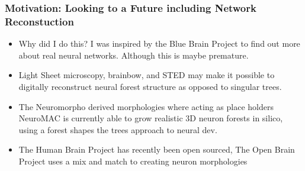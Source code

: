 \documentclass{beamer}
\begin{document}

\begin{frame}
\frametitle{Motivation: Looking to a Future including Network Reconstuction}%
\begin{itemize}
\vfill\item Why did I do this? I was inspired by the Blue Brain Project to find out more about real neural networks. Although this is maybe premature.

\vfill \item Light Sheet microscopy, brainbow, and STED may make it possible to digitally reconstruct neural forest structure as opposed to singular trees.

\vfill\item The Neuromorpho derived morphologies where acting as place holders NeuroMAC is currently able to grow realistic 3D neuron forests in silico, using a forest shapes the trees approach to neural dev.
\vfill \item The Human Brain Project has recently been open sourced, The Open Brain Project uses a mix and match to creating neuron morphologies


\lstI

\end{itemize}
\end{frame}
\end{document}
